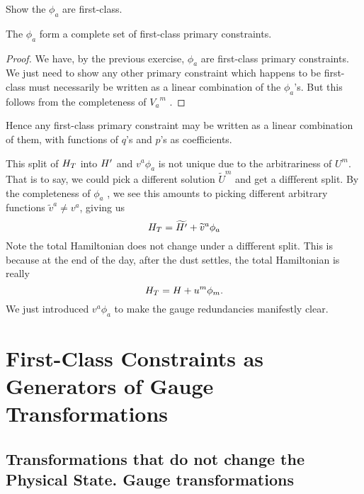 \begin{xca}
Show the $\phi_{a}$ are first-class.
\end{xca}

\begin{thm}\label{thm:constrained:phi-a-complete-first-class-primary-constraints}
The $\phi_{a}$ form a complete set of first-class primary
constraints.
\end{thm}

\begin{proof}
We have, by the previous exercise, $\phi_{a}$ are first-class primary
constraints. We just need to show any other primary constraint which
happens to be first-class must necessarily be written as a linear
combination of the $\phi_{a}$'s. But this follows from the completeness
of ${V_{a}}^{m}$ .
\end{proof}

Hence any first-class primary constraint may be written as a linear
combination of them, with functions of $q$'s and $p$'s as coefficients.

This split of $H_{T}$ into $H'$ and
$v^{a}\phi_{a}$ is not unique due to the arbitrariness of $U^{m}$. That
is to say, we could pick a different solution $\widetilde{U}^{m}$ and
get a diffferent split. By the completeness of $\phi_{a}$
,
we see this amounts to picking different arbitrary functions
$\widetilde{v}^{a}\neq v^{a}$, giving us 
\begin{equation}
H_{T} = \widetilde{H'} + \widetilde{v}^{a}\phi_{a}
\end{equation}
Note the total Hamiltonian does not change under a diffferent
split. This is because at the end of the day, after the dust settles,
the total Hamiltonian is really
\begin{equation}
H_{T} = H + u^{m}\phi_{m}.
\end{equation}
We just introduced $v^{a}\phi_{a}$ to make the gauge redundancies
manifestly clear.

\section{First-Class Constraints as Generators of Gauge Transformations}
\subsection{Transformations that do not change the Physical State. Gauge transformations}


